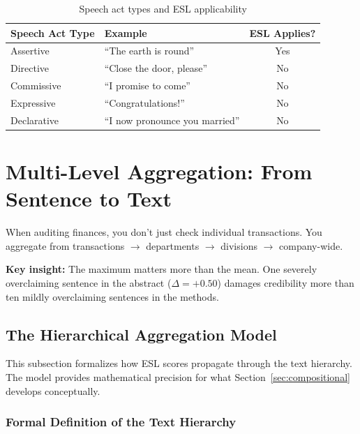 \begin{table}[H]
\centering
\caption{Speech act types and ESL applicability}
\begin{tabular}{llc}
\toprule
\textbf{Speech Act Type} & \textbf{Example} & \textbf{ESL Applies?} \\
\midrule
Assertive & ``The earth is round'' & Yes \\
Directive & ``Close the door, please'' & No \\
Commissive & ``I promise to come'' & No \\
Expressive & ``Congratulations!'' & No \\
Declarative & ``I now pronounce you married'' & No \\
\bottomrule
\end{tabular}
\end{table}



\section{Multi-Level Aggregation: From Sentence to Text}
\label{sec:aggregation}

\begin{analogybox}
When auditing finances, you don't just check individual transactions. You aggregate from transactions $\rightarrow$ departments $\rightarrow$ divisions $\rightarrow$ company-wide.

\textbf{Key insight:} The maximum matters more than the mean. One severely overclaiming sentence in the abstract ($\Delta = +0.50$) damages credibility more than ten mildly overclaiming sentences in the methods.
\end{analogybox}


\subsection{The Hierarchical Aggregation Model}

This subsection formalizes how ESL scores propagate through the text hierarchy. The model provides mathematical precision for what Section~\ref{sec:compositional} develops conceptually.

\subsubsection{Formal Definition of the Text Hierarchy}


